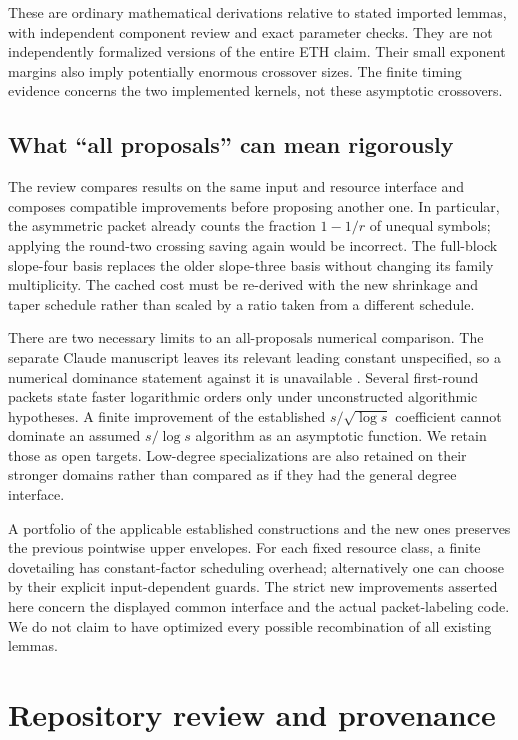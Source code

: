 \documentclass[11pt,letterpaper]{article}
\theoremstyle{remark}\newtheorem{remark}[theorem]{Remark}
\begin{document}
These are ordinary mathematical derivations relative to stated imported
lemmas, with independent component review and exact parameter checks.
They are not independently formalized versions of the entire ETH claim.
Their small exponent margins also imply potentially enormous crossover
sizes. The finite timing evidence concerns the two implemented kernels,
not these asymptotic crossovers.

\subsection{What ``all proposals'' can mean rigorously}

The review compares results on the same input and resource interface and
composes compatible improvements before proposing another one. In
particular, the asymmetric packet already counts the fraction $1-1/r$ of
unequal symbols; applying the round-two crossing saving again would be
incorrect. The full-block slope-four basis replaces the older slope-three
basis without changing its family multiplicity. The cached cost must be
re-derived with the new shrinkage and taper schedule rather than scaled
by a ratio taken from a different schedule.

There are two necessary limits to an all-proposals numerical comparison.
The separate Claude manuscript leaves its relevant leading constant
unspecified, so a numerical dominance statement against it is unavailable
\cite{claude}. Several first-round packets state faster logarithmic orders
only under unconstructed algorithmic hypotheses. A finite improvement of
the established $s/\sqrt{\log s}$ coefficient cannot dominate an assumed
$s/\log s$ algorithm as an asymptotic function. We retain those as open
targets. Low-degree specializations are also retained on their stronger
domains rather than compared as if they had the general degree interface.

A portfolio of the applicable established constructions and the new ones
preserves the previous pointwise upper envelopes. For each fixed resource
class, a finite dovetailing has constant-factor scheduling overhead;
alternatively one can choose by their explicit input-dependent guards.
The strict new improvements asserted here concern the displayed common
interface and the actual packet-labeling code. We do not claim to have
optimized every possible recombination of all existing lemmas.

\section{Repository review and provenance}
\label{sec:review}
\end{document}
